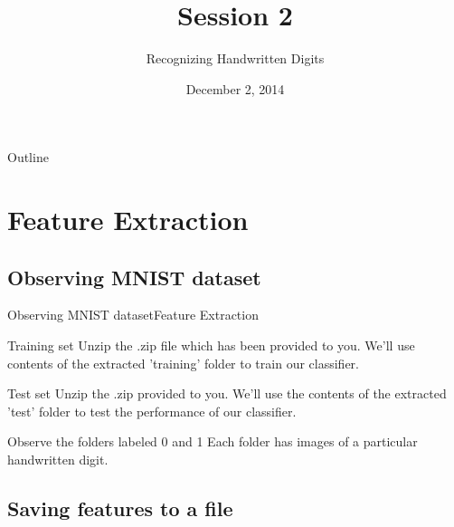 \documentclass{beamer}
\title{Session 2}
\subtitle{Recognizing Handwritten Digits}
\institute[Computer Vision Group]
{
  Computer Vision Group\\
  IIT Madras
}
\date{December 2, 2014}
\begin{document}
\begin{frame}
  \titlepage
\end{frame}

\begin{frame}{Outline}
  \tableofcontents
\end{frame}

\section{Feature Extraction}

\subsection{Observing MNIST dataset}
\begin{frame}{Observing MNIST dataset}{Feature Extraction}
    \begin{block}{Training set}
        Unzip the .zip file which has been provided to you. We'll use contents of the extracted 'training' folder to train
        our classifier.
    \end{block}
    \begin{block}{Test set}
        Unzip the .zip provided to you. We'll use the contents of the extracted 'test' folder to test
        the performance of our classifier.
    \end{block}

    \begin{block}{Observe the folders labeled 0 and 1}
        Each folder has images of a particular handwritten digit. 
    \end{block}
\end{frame}

\subsection{Saving features to a file}
\end{document}
